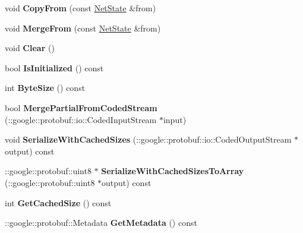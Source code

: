 \begin{DoxyCompactItemize}
void {\bfseries Copy\+From} (const \mbox{\hyperlink{classcaffe_1_1_net_state}{Net\+State}} \&from)
\item 
\mbox{\label{classcaffe_1_1_net_state_aab56e0620316a07a62771c70161c9bad}} 
void {\bfseries Merge\+From} (const \mbox{\hyperlink{classcaffe_1_1_net_state}{Net\+State}} \&from)
\item 
\mbox{\label{classcaffe_1_1_net_state_a3c3c7c3e057a99ae94e6c6da0c5b9990}} 
void {\bfseries Clear} ()
\item 
\mbox{\label{classcaffe_1_1_net_state_a3767aa4090a5825ca3d8cc2eda7346a8}} 
bool {\bfseries Is\+Initialized} () const
\item 
\mbox{\label{classcaffe_1_1_net_state_aa23855a83b11c6e89faf6d656062f6ea}} 
int {\bfseries Byte\+Size} () const
\item 
\mbox{\label{classcaffe_1_1_net_state_ab4bcdfa84b50d0101e1ca4b9343d01d4}} 
bool {\bfseries Merge\+Partial\+From\+Coded\+Stream} (\+::google\+::protobuf\+::io\+::\+Coded\+Input\+Stream $\ast$input)
\item 
\mbox{\label{classcaffe_1_1_net_state_a8c3b31bf5de5c46ab2965506daf74e6e}} 
void {\bfseries Serialize\+With\+Cached\+Sizes} (\+::google\+::protobuf\+::io\+::\+Coded\+Output\+Stream $\ast$output) const
\item 
\mbox{\label{classcaffe_1_1_net_state_ad54ccc30a13dadbb57d6698d9fc9e088}} 
\+::google\+::protobuf\+::uint8 $\ast$ {\bfseries Serialize\+With\+Cached\+Sizes\+To\+Array} (\+::google\+::protobuf\+::uint8 $\ast$output) const
\item 
\mbox{\label{classcaffe_1_1_net_state_a7196ffae014e07acf336d6c317cb25eb}} 
int {\bfseries Get\+Cached\+Size} () const
\item 
\mbox{\label{classcaffe_1_1_net_state_a158996a27da13cf8fbfbbc42f9d42707}} 
\+::google\+::protobuf\+::\+Metadata {\bfseries Get\+Metadata} () const
\item 

\end{DoxyCompactItemize}
